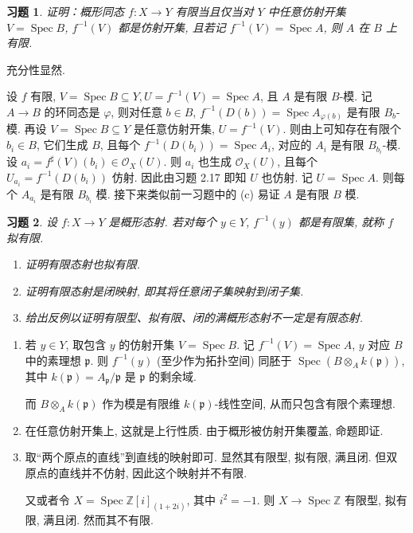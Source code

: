 \documentclass{article}
\theoremstyle{exercise}
\newtheorem{exercise}{习题}[section]
\newenvironment{proofc}{\proof}{\endproof}
\def\gp{\mathfrak{p}}
\def\Z{\mathbb{Z}}
\def\cO{\mathcal{O}}
\def\Spec{\operatorname{Spec}}
\begin{document}
\begin{exercise}
  证明：概形同态 $f \colon X \to Y$ 有限当且仅当对 $Y$ 中\emph{任意}仿射开集 $V = \Spec B$,
  $f^{-1}(V)$ 都是仿射开集, 且若记 $f^{-1}(V) = \Spec A$, 则 $A$ 在 $B$ 上有限.
\end{exercise}

\begin{proofc}
  充分性显然.

  设 $f$ 有限, $V = \Spec B \subseteq Y, U = f^{-1}(V) = \Spec A$,
  且 $A$ 是有限 $B$-模. 记 $A \to B$ 的环同态是 $\varphi$,
  则对任意 $b \in B$, $f^{-1}(D(b)) = \Spec A_{\varphi(b)}$ 是有限 $B_b$-模.
  再设 $V = \Spec B \subseteq Y$ 是任意仿射开集, $U = f^{-1}(V)$.
  则由上可知存在有限个 $b_i \in B$, 它们生成 $B$,
  且每个 $f^{-1}(D(b_i)) = \Spec A_i$, 对应的 $A_i$ 是有限 $B_{b_i}$-模.
  设 $a_i = f^\sharp(V)(b_i) \in \cO_X(U)$.
  则 $a_i$ 也生成 $\cO_X(U)$, 且每个 $U_{a_i} = f^{-1}(D(b_i))$ 仿射.
  因此由习题 2.17 即知 $U$ 也仿射. 记 $U = \Spec A$.
  则每个 $A_{a_i}$ 是有限 $B_{b_i}$ 模.
  接下来类似前一习题中的 (c) 易证 $A$ 是有限 $B$ 模.
\end{proofc}

\begin{exercise}
  设 $f \colon X \to Y$ 是概形态射. 若对每个 $y \in Y$, $f^{-1}(y)$ 都是有限集,
  就称 $f$ \emph{拟有限}.
  \begin{enumerate}[label={(\alph*)}]
    \item 证明有限态射也拟有限.
    \item 证明有限态射是\emph{闭映射}, 即其将任意闭子集映射到闭子集.
    \item 给出反例以证明有限型、拟有限、闭的满概形态射不一定是有限态射.
  \end{enumerate}
\end{exercise}

\begin{proofc}
  \begin{enumerate}[label={(\alph*)}]
    \item 若 $y \in Y$, 取包含 $y$ 的仿射开集 $V = \Spec B$.
          记 $f^{-1}(V) = \Spec A$, $y$ 对应 $B$ 中的素理想 $\gp$.
          则 $f^{-1}(y)$ (至少作为拓扑空间) 同胚于 $\Spec (B \otimes_A k(\gp))$,
          其中 $k(\gp) = A_{\gp} / \gp$ 是 $\gp$ 的剩余域.

          而 $B \otimes_A k(\gp)$ 作为模是有限维 $k(\gp)$-线性空间, 从而只包含有限个素理想.
    \item 在任意仿射开集上, 这就是上行性质. 由于概形被仿射开集覆盖, 命题即证. %
    \item 取“两个原点的直线”到直线的映射即可. 显然其有限型, 拟有限, 满且闭. %
          但双原点的直线并不仿射, 因此这个映射并不有限.

          又或者令 $X = \Spec \Z[i]_{(1+2i)}$, 其中 $i^2 = -1$.
          则 $X \to \Spec \Z$ 有限型, 拟有限, 满且闭. 然而其不有限.
          \qedhere
  \end{enumerate}
\end{proofc}
\end{document}
